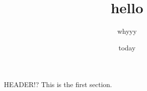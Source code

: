\documentclass{article}
\title{hello}
\author{whyyy}
\date{today}
\begin{document}
\maketitle
\begin{section} {HEADER!?}
    This is the first section.
    
\end{section}
\end{document}

